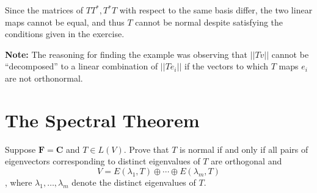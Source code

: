 \begin{solution}
     Since the matrices of $TT^*, T^*T$ with respect to the same basis differ, the two linear maps cannot be equal, and thus $T$ cannot be normal despite satisfying the conditions given in the exercise. 

     \textbf{Note:} The reasoning for finding the example was observing that $\lvert \lvert Tv \rvert \rvert$ cannot be ``decomposed'' to a linear combination of $\lvert \lvert Te_i \rvert \rvert$ if the vectors to which $T$ maps $e_i$ are not orthonormal.
\end{solution}

\section{The Spectral Theorem}

\begin{exercise}{4}
    Suppose $\mathbf{F} = \mathbf{C}$ and $T \in L(V)$. Prove that $T$ is normal if and only if all pairs of eigenvectors corresponding to distinct eigenvalues of $T$ are orthogonal and 
    $$V = E(\lambda_1, T) \oplus \cdots \oplus E(\lambda_m, T)$$,
    where $\lambda_1, \ldots, \lambda_m$ denote the distinct eigenvalues of $T$.
\end{exercise}

